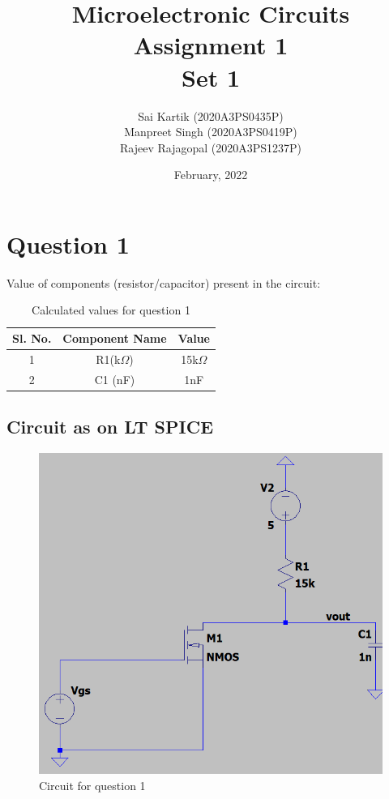 \documentclass[titlepage]{article}
\title{Microelectronic Circuits Assignment 1\\[5ex]Set 1}
\author{Sai Kartik (2020A3PS0435P)\\ Manpreet Singh (2020A3PS0419P)\\ Rajeev Rajagopal (2020A3PS1237P)}
\date{February, 2022}
\begin{document}
\maketitle
\tableofcontents
\listoffigures
\listoftables
\newpage
{}
\setcounter{page}{1}
\section{Question 1}
Value of components (resistor/capacitor) present in the circuit:
\begin{table}[ht]
    \centering
    \caption{Calculated values for question 1}
    \begin{tabular}{|c | c | c|}
        \hline
        Sl. No. & Component Name & Value       \\
        \hline
        1       & R1(k$\Omega$)  & 15k$\Omega$ \\ %
        2       & C1 (nF)        & 1nF         \\ %
        \hline
    \end{tabular}
    \label{tab:values1}
\end{table}
\subsection{Circuit as on LT SPICE}
\begin{figure}[ht]
    \centering
    \includegraphics[scale=0.50]{resources/q1.png}
    \caption{Circuit for question 1}
    \label{fig:circuit1}
\end{figure}
\newpage
\end{document}
